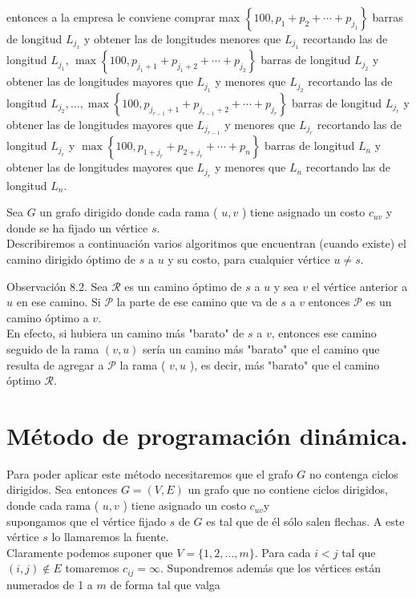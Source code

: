 \documentclass[10pt]{article}
\begin{document}
entonces a la empresa le conviene comprar max $\left\{100, p_{1}+p_{2}+\cdots+p_{j_{1}}\right\}$ barras de longitud $L_{j_{1}}$ y obtener las de longitudes menores que $L_{j_{1}}$ recortando las de longitud $L_{j_{1}}$, $\max \left\{100, p_{j_{1}+1}+p_{j_{1}+2}+\cdots+p_{j_{2}}\right\}$ barras de longitud $L_{j_{2}}$ y obtener las de longitudes mayores que $L_{j_{1}}$ y menores que $L_{j_{2}}$ recortando las de longitud $L_{j_{2}}, \ldots, \max \left\{100, p_{j_{r-1}+1}+p_{j_{r-1}+2}+\cdots+p_{j_{r}}\right\}$ barras de longitud $L_{j_{r}}$ y obtener las de longitudes mayores que $L_{j_{r-1}}$ y menores que $L_{j_{r}}$ recortando las de longitud $L_{j_{r}}$ y $\max \left\{100, p_{1+j_{r}}+p_{2+j_{r}}+\cdots+p_{n}\right\}$ barras de longitud $L_{n}$ y obtener las de longitudes mayores que $L_{j_{r}}$ y menores que $L_{n}$ recortando las de longitud $L_{n}$.

Sea $G$ un grafo dirigido donde cada rama ( $u, v$ ) tiene asignado un costo $c_{u v}$ y donde se ha fijado un vértice $s$.\\
Describiremos a continuación varios algoritmos que encuentran (cuando existe) el camino dirigido óptimo de $s$ a $u$ y su costo, para cualquier vértice $u \neq s$.

Observación 8.2. Sea $\mathcal{R}$ es un camino óptimo de $s$ a $u$ y sea $v$ el vértice anterior a $u$ en ese camino. Si $\mathcal{P}$ la parte de ese camino que va de $s$ a $v$ entonces $\mathcal{P}$ es un camino óptimo a $v$.\\
En efecto, si hubiera un camino más "barato" de $s$ a $v$, entonces ese camino seguido de la rama $(v, u)$ sería un camino más "barato" que el camino que resulta de agregar a $\mathcal{P}$ la rama ( $v, u$ ), es decir, más "barato" que el camino óptimo $\mathcal{R}$.

\section*{Método de programación dinámica.}
Para poder aplicar este método necesitaremos que el grafo $G$ no contenga ciclos dirigidos. Sea entonces $G=(V, E)$ un grafo que no contiene ciclos dirigidos, donde cada rama ( $u, v$ ) tiene asignado un costo $c_{u v} \mathrm{y}$\\
supongamos que el vértice fijado $s$ de $G$ es tal que de él sólo salen flechas. A este vértice $s$ lo llamaremos la fuente.\\
Claramente podemos suponer que $V=\{1,2, \ldots, m\}$. Para cada $i<j$ tal que $(i, j) \notin E$ tomaremos $c_{i j}=\infty$. Supondremos además que los vértices están numerados de 1 a $m$ de forma tal que valga
\end{document}

